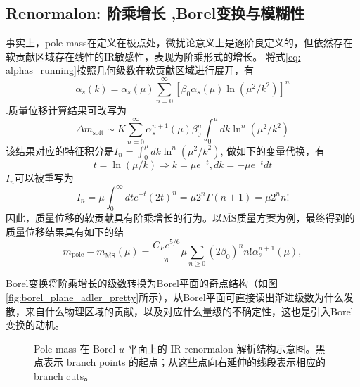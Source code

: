 \subsection{Renormalon: 阶乘增长 ,Borel变换与模糊性}
事实上，pole mass在定义在极点处，微扰论意义上是逐阶良定义的，但依然存在软贡献区域存在线性的IR敏感性，表现为阶乘形式的增长。
将式\eqref{eq: alphas_running}按照几何级数在软贡献区域进行展开，有$$\alpha_s(k)=\alpha_s(\mu) \sum_{n=0}^{\infty}\left[\beta_0 \alpha_s(\mu) \ln \left(\mu^2 / k^2\right)\right]^n$$.质量位移计算结果可改写为
$$
\Delta m_{\mathrm{soft}} \sim K \sum_{n=0}^{\infty} \alpha_s^{n+1}(\mu) \beta_0^n \int_0^\mu d k \ln ^n\left(\mu^2 / k^2\right)
$$
该结果对应的特征积分是$I_n=\int_0^\mu d k \ln ^n\left(\mu^2 / k^2\right)$, 做如下的变量代换，有
$$
t=\ln (\mu / k) \Rightarrow k=\mu e^{-t}, d k=-\mu e^{-t} d t
$$
$I_n$可以被重写为
\begin{equation}
  \boxed{
I_n=\mu \int_0^{\infty} d t e^{-t}(2 t)^n=\mu 2^n \Gamma(n+1)=\mu 2^n n!}
\label{eq: chatacter_Integral}
\end{equation}
因此，质量位移的软贡献具有阶乘增长的行为\cite{Bigi:1994em}。以$\overline{\text{MS}}$质量方案为例，最终得到的质量位移结果具有如下的结\cite{Beneke:2021lkq}
\begin{equation}
m_{\mathrm{pole}}-m_{\overline{\mathrm{MS}}}(\mu)=\frac{C_F e^{5 / 6}}{\pi} \mu \sum_{n \geq 0}\left(2 \beta_0\right)^n n!\alpha_s^{n+1}(\mu),
\end{equation}

Borel变换将阶乘增长的级数转换为Borel平面的奇点结构（如图\ref{fig:borel_plane_adler_pretty}所示），从Borel平面可直接读出渐进级数为什么发散，来自什么物理区域的贡献，以及对应什么量级的不确定性，这也是引入Borel变换的动机。
\begin{figure}[htbp]
\centering
{}
\caption{Pole mass 在 Borel \(u\)-平面上的 IR renormalon 解析结构示意图。黑点表示 branch points 的起点；从这些点向右延伸的线段表示相应的 branch cuts。}
\label{fig:pole_mass_borel_branch}
\end{figure}

